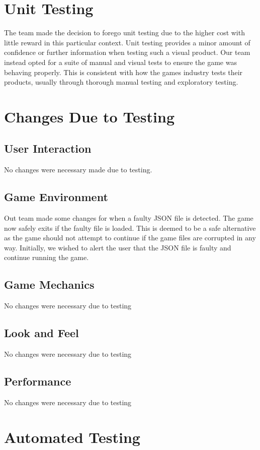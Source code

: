\documentclass[12pt, titlepage]{article}
\begin{document}
\section{Unit Testing}

The team made the decision to forego unit testing due to the higher cost with little reward in this particular context. Unit testing provides a minor amount of confidence or further information when testing such a visual product. Our team instead opted for a suite of manual and visual tests to ensure the game was behaving properly. This is consistent with how the games industry tests their products, usually through thorough manual testing and exploratory testing.

\section{Changes Due to Testing}
\subsection{User Interaction}
No changes were necessary made due to testing.
\subsection{Game Environment}
Out team made some changes for when a faulty JSON file is detected. The game now safely exits if the faulty file is loaded. This is deemed to be a safe alternative as the game should not attempt to continue if the game files are corrupted in any way. Initially, we wished to alert the user that the JSON file is faulty and continue running the game.
\subsection{Game Mechanics}
No changes were necessary due to testing
\subsection{Look and Feel}
No changes were necessary due to testing
\subsection{Performance}
No changes were necessary due to testing
\section{Automated Testing}
\end{document}
